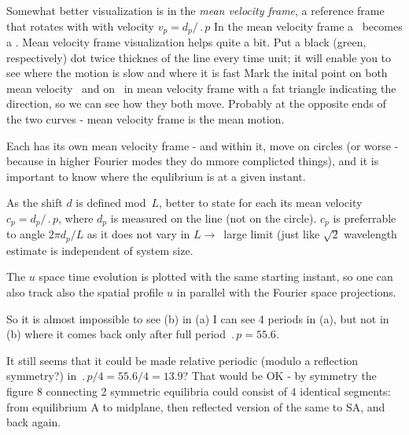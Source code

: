 Somewhat better visualization is in the
{\em mean velocity frame}, {\ie} 
a reference frame that rotates with with velocity 
$v_p=d_p/\period{p}$
In the mean velocity frame a \rpo\ becomes
a \po.
Mean velocity frame visualization helps quite a bit.
Put a black (green, respectively) dot
twice thicknes of the line every time unit; it will enable you to see
where the motion is slow and where it is fast
Mark the inital point on both
mean velocity \rpo\ and on \eqv\  in mean velocity
 frame with a fat triangle
indicating the direction, so we can see how they both move. Probably at the
opposite ends of the two curves - mean velocity frame is the mean motion.


Each {\rpo} has its own mean velocity frame - and within it, {\eqv}
move on circles (or worse - because in higher Fourier modes they do mmore
complicted things), and it is important to know where the equlibrium is at
a given instant.

As the shift $d$ is defined mod~$L$, better to
state for each {\rpo} its mean velocity $c_p = d_p/\period{p}$,
where $d_p$ is measured on the line (not on the circle). $c_p$ is
preferrable to angle $2\pi d_p/L$ as it does not vary in $L \to$~large 
limit (just like $\sqrt{2}$ wavelength estimate is independent of
system size.




The $u$ space time evolution  %
is plotted with the same starting instant,
so one can also track also the spatial profile $u$ in parallel with
the Fourier space projections.

So it is almost impossible to see (b) %
in (a) %
I can see 4 periods in (a), %
but not in (b) %
where it comes back only after full period $\period{p}=55.6$.

It still seems that it could be made relative periodic 
(modulo a reflection symmetry?)
in $\period{p}/4=55.6/4=13.9$? That would be OK 
-
by symmetry the figure 8 connecting
2 symmetric equilibria could consist of 4 identical segments: from
equilibrium A to midplane, then reflected version of the same to SA, and
back again.

